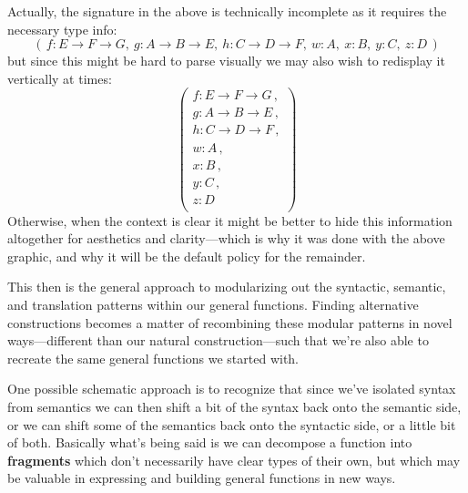 \documentclass[twoside]{article}
\newcommand{\strong}[1]{{\bfseries #1}}
\begin{document}
Actually, the signature in the above is technically incomplete as it requires the necessary type info:
$$ (\,f : E\to F\to G,\ g : A\to B\to E,\ h : C\to D\to F,\ w : A,\ x : B,\ y : C,\ z : D\,) $$
but since this might be hard to parse visually we may also wish to redisplay it vertically at times:
$$ \left(\begin{array}{l}
f : E\to F\to G\,,		\\
g : A\to B\to E\,,		\\
h : C\to D\to F\,,		\\
w : A	       \,,		\\
x : B	       \,,		\\
y : C	       \,,		\\
z : D				\\
\end{array}\right) $$
Otherwise, when the context is clear it might be better to hide this information altogether for aesthetics and
clarity---which is why it was done with the above graphic, and why it will be the default policy for the remainder.

This then is the general approach to modularizing out the syntactic, semantic, and translation patterns within our
general functions. Finding alternative constructions becomes a matter of recombining these modular patterns in novel
ways---different than our natural construction---such that we're also able to recreate the same general functions
we started with.

One possible schematic approach is to recognize that since we've isolated syntax from semantics we can then shift
a bit of the syntax back onto the semantic side, or we can shift some of the semantics back onto the syntactic side,
or a little bit of both. Basically what's being said is we can decompose a function into \strong{fragments} which
don't necessarily have clear types of their own, but which may be valuable in expressing and building general
functions in new ways.
\end{document}
